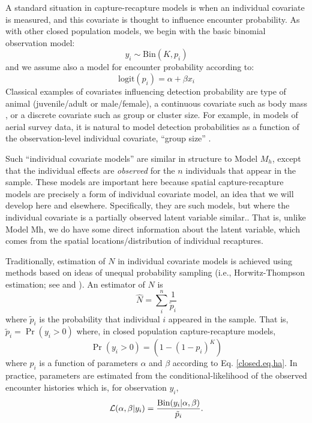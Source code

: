 A standard situation in capture-recapture models is when an individual
covariate is measured, and this covariate is thought to influence
encounter probability.  As with other closed population models, we
begin with the basic binomial observation model:
\[
y_{i} \sim \mbox{Bin}(K, p_{i})
\]
and we assume also  a model for encounter probability according to:
\begin{equation}
 \mbox{logit}(p_{i}) = \alpha + \beta x_{i}
\label{closed.eq.ha}
\end{equation}
Classical examples of covariates influencing detection probability are
type of animal (juvenile/adult or male/female), a continuous covariate
such as body mass \citep[][ch. 6]{royle_dorazio:2008}, or a
discrete covariate such as group or cluster size. For example, in
models of aerial survey data, it is natural to model detection
probabilities as a function of the observation-level individual
covariate, ``group size'' \citep{royle:2008, royle:2009,
  langtimm_etal:2011}.

Such ``individual covariate models'' are similar in structure to Model
$M_{h}$, except that the individual effects are {\it observed} for the
$n$ individuals that appear in the sample. These models are important
here because spatial capture-recapture models are precisely a form of
individual covariate model, an idea that we will develop here and
elsewhere. Specifically, they are such models, but where the
individual covariate is a partially observed latent variable similar..
That is, unlike Model Mh, we do have some direct information about the
latent variable, which comes from the spatial locations/distribution
of individual recaptures.

Traditionally, estimation of $N$ in individual covariate models is
achieved using methods based on ideas of unequal probability sampling
(i.e., Horwitz-Thompson estimation; see \citet{huggins:1989} and
\citet{alho:1990}). An estimator of $N$ is
\[
\hat{N} = \sum_{i}^{n} \frac{1}{\tilde{p}_{i}}
\]
where $\tilde{p}_{i}$ is the probability that individual $i$ appeared
in the sample.  That is, $\tilde{p}_{i} = \Pr(y_{i}>0)$
where, in closed population capture-recapture models, 
\[
\Pr(y_{i}>0) = (1- (1-p_{i})^K)
\]
where $p_{i}$ is a function of parameters $\alpha$ and $\beta$
according to
Eq. \ref{closed.eq.ha}.
In practice, parameters are estimated 
from the conditional-likelihood of the observed encounter histories
which is, for observation $y_{i}$, 
\[
{\cal L}(\alpha, \beta | y_{i}) = \frac{ \mbox{Bin}(y_{i}|\alpha,\beta) } { \tilde{p}_{i}}.
\]

